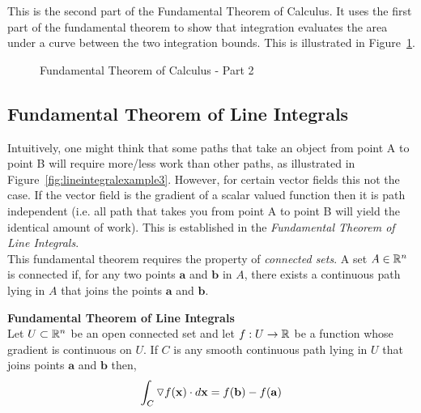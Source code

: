 \documentclass[12pt]{article}
\begin{document}
This is the second part of the Fundamental Theorem of Calculus. It uses the first part of the fundamental theorem to show that integration evaluates the area under a curve between the two integration bounds. This is illustrated in Figure~\ref{fig:ftc2}.

\begin{figure}[h!]
\centering
\caption{Fundamental Theorem of Calculus - Part 2}
\label{fig:ftc2}
\end{figure}

\subsection{Fundamental Theorem of Line Integrals}

Intuitively, one might think that some paths that take an object from point A to point B will require more/less work than other paths, as illustrated in Figure~\ref{fig:lineintegralexample3}. However, for certain vector fields this not the case. If the vector field is the gradient of a scalar valued function then it is path independent (i.e. all path that takes you from point A to point B will yield the identical amount of work). This is established in the \emph{Fundamental Theorem of Line Integrals}.\\

This fundamental theorem requires the property of \emph{connected sets}. A set  $A\in\mathbb{R}^n$ is connected if, for any two points $\mathbf{a}$ and $\mathbf{b}$ in $A$, there exists a continuous path lying in $A$ that joins the points $\mathbf{a}$ and $\mathbf{b}$. \\

\begin{framed}
\textbf{Fundamental Theorem of Line Integrals}\\
Let $U\subset\mathbb{R}^n$ be an open connected set and let $f:U\rightarrow\mathbb{R}$ be a function whose gradient is continuous on $U$. If $C$ is any smooth continuous path lying in $U$ that joins points $\mathbf{a}$ and $\mathbf{b}$ then,
\[
\int_C \triangledown f(\mathbf{x}) \cdot d\mathbf{x} = f(\mathbf{b})-f(\mathbf{a})
\]
\end{framed}
\end{document}
